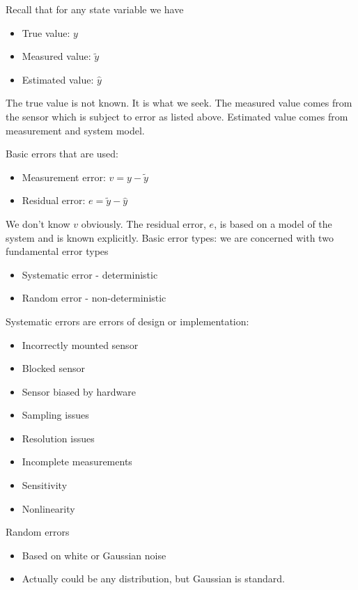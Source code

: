 Recall that for any state variable we have

\begin{itemize}
\tightlist
\item
  True value: \(y\)
\item
  Measured value: \(\tilde{y}\)
\item
  Estimated value: \(\hat{y}\)
\end{itemize}

The true value is not known. It is what we seek. The measured value
comes from the sensor which is subject to error as listed above.
Estimated value comes from measurement and system model.

Basic errors that are used:

\begin{itemize}
\tightlist
\item
  Measurement error: \(v = y - \tilde{y}\)
\item
  Residual error: \(e = \tilde{y} - \hat{y}\)
\end{itemize}

We don't know \(v\) obviously. The residual error, \(e\), is based on a
model of the system and is known explicitly. Basic error types: we are
concerned with two fundamental error types

\begin{itemize}
\tightlist
\item
  Systematic error - deterministic
\item
  Random error - non-deterministic
\end{itemize}

Systematic errors are errors of design or implementation:

\begin{itemize}
\tightlist
\item
  Incorrectly mounted sensor
\item
  Blocked sensor
\item
  Sensor biased by hardware
\item
  Sampling issues
\item
  Resolution issues
\item
  Incomplete measurements
\item
  Sensitivity
\item
  Nonlinearity
\end{itemize}

Random errors

\begin{itemize}
\tightlist
\item
  Based on white or Gaussian noise
\item
  Actually could be any distribution, but Gaussian is standard.
\end{itemize}

